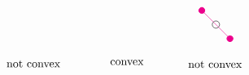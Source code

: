 \documentclass[12pt]{article}
\begin{document}
\[\begin{tikzpicture}[x=0.75pt,y=0.75pt,yscale=-1,xscale=1]
    \draw [color=magenta  ,draw opacity=1 ]   (296,99.12) -- (328.92,132.47) ;
    \draw [shift={(328.92,132.47)}, rotate = 45.36] [color=magenta  ,draw opacity=1 ][fill=magenta  ,fill opacity=1 ][line width=0.75]      (0, 0) circle [x radius= 3.35, y radius= 3.35]   ;
    \draw [shift={(296,99.12)}, rotate = 45.36] [color=magenta  ,draw opacity=1 ][fill=magenta  ,fill opacity=1 ][line width=0.75]      (0, 0) circle [x radius= 3.35, y radius= 3.35]   ;
    \draw   (308.17,115.79) .. controls (308.17,113.43) and (310.09,111.5) .. (312.46,111.5) .. controls (314.83,111.5) and (316.75,113.43) .. (316.75,115.79) .. controls (316.75,118.16) and (314.83,120.08) .. (312.46,120.08) .. controls (310.09,120.08) and (308.17,118.16) .. (308.17,115.79) -- cycle ;
    
    \draw (66,156.67) node [anchor=north west][inner sep=0.75pt]   [align=left] {not convex};
    \draw (187.33,156.67) node [anchor=north west][inner sep=0.75pt]   [align=left] {convex};
    \draw (278.67,157.33) node [anchor=north west][inner sep=0.75pt]   [align=left] {not convex};
    
    
    \end{tikzpicture}
    \]
\end{document}
